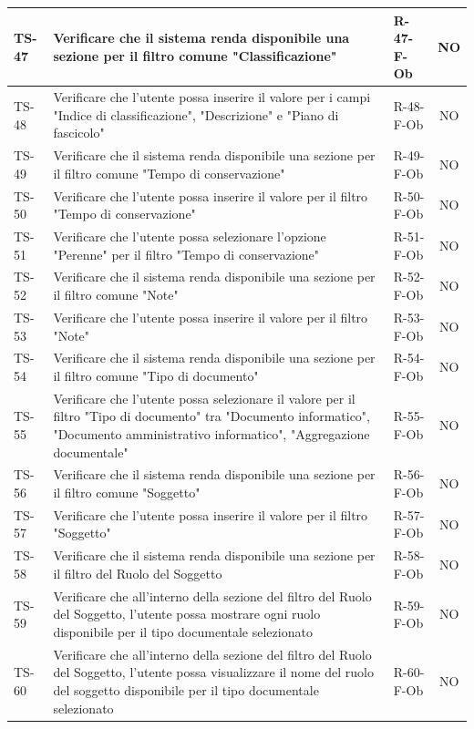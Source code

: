 \documentclass[a4paper,12pt]{article}
\begin{document}
\begin{longtable}{|p{1.5cm}|p{8.3cm}|p{2.4cm}|c|}
\hline
TS-47 & Verificare che il sistema renda disponibile una sezione per il filtro comune "Classificazione" & R-47-F-Ob & NO \\
\hline
TS-48 & Verificare che l'utente possa inserire il valore per i campi "Indice di classificazione", "Descrizione" e "Piano di fascicolo" & R-48-F-Ob & NO \\
\hline
TS-49 & Verificare che il sistema renda disponibile una sezione per il filtro comune "Tempo di conservazione" & R-49-F-Ob & NO \\
\hline
TS-50 & Verificare che l'utente possa inserire il valore per il filtro "Tempo di conservazione" & R-50-F-Ob & NO \\
\hline
TS-51 & Verificare che l'utente possa selezionare l'opzione "Perenne" per il filtro "Tempo di conservazione" & R-51-F-Ob & NO \\
\hline
TS-52 & Verificare che il sistema renda disponibile una sezione per il filtro comune "Note" & R-52-F-Ob & NO \\
\hline
TS-53 & Verificare che l'utente possa inserire il valore per il filtro "Note" & R-53-F-Ob & NO \\
\hline
TS-54 & Verificare che il sistema renda disponibile una sezione per il filtro comune "Tipo di documento" & R-54-F-Ob & NO \\
\hline
TS-55 & Verificare che l'utente possa selezionare il valore per il filtro "Tipo di documento" tra "Documento informatico", "Documento amministrativo informatico", "Aggregazione documentale" & R-55-F-Ob & NO \\
\hline
TS-56 & Verificare che il sistema renda disponibile una sezione per il filtro comune "Soggetto" & R-56-F-Ob & NO \\
\hline
TS-57 & Verificare che l'utente possa inserire il valore per il filtro "Soggetto" & R-57-F-Ob & NO \\
\hline
TS-58 & Verificare che il sistema renda disponibile una sezione per il filtro del Ruolo del Soggetto & R-58-F-Ob & NO \\
\hline
TS-59 & Verificare che all'interno della sezione del filtro del Ruolo del Soggetto, l'utente possa mostrare ogni ruolo disponibile per il tipo documentale selezionato & R-59-F-Ob & NO \\
\hline
TS-60 & Verificare che all'interno della sezione del filtro del Ruolo del Soggetto, l'utente possa visualizzare il nome del ruolo del soggetto disponibile per il tipo documentale selezionato & R-60-F-Ob & NO \\
\hline

\end{longtable}
\end{document}
